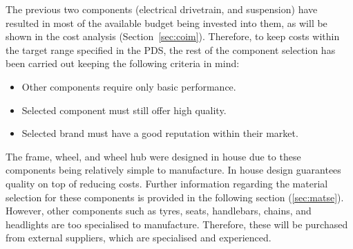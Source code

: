 \documentclass[a4paper,11pt]{article}
\begin{document}
The previous two components (electrical drivetrain, and suspension) have resulted in most of the available budget being invested into them, as will be shown in the cost analysis (Section~\ref{sec:coim}). Therefore, to keep costs within the target range specified in the PDS, the rest of the component selection has been carried out keeping the following criteria in mind: 

\begin{itemize}
	\setlength{\itemsep}{0pt}
	\item Other components require only basic performance.
	\item Selected component must still offer high quality.
	\item Selected brand must have a good reputation within their market.
\end{itemize}

The frame, wheel, and wheel hub were designed in house due to these components being relatively simple to manufacture. In house design guarantees quality on top of reducing costs. Further information regarding the material selection for these components is provided in the following section (\ref{sec:matse}). However, other components such as tyres, seats, handlebars, chains, and headlights are too specialised to manufacture. Therefore, these will be purchased from external suppliers, which are specialised and experienced. 
\end{document}
